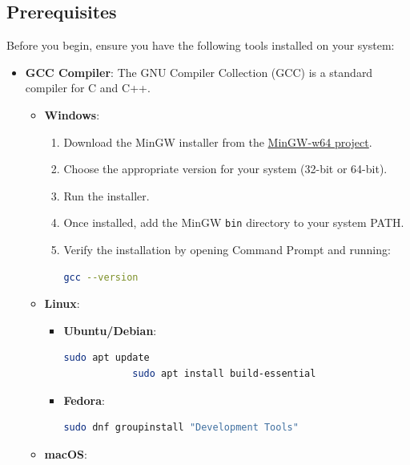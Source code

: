 \documentclass[12pt,a4paper]{report}
\begin{document}
\subsection{Prerequisites}
Before you begin, ensure you have the following tools installed on your system:
\begin{itemize}
    \item \normalsize \textbf{GCC Compiler}: The GNU Compiler Collection (GCC) is a standard compiler for C and C++.
    \begin{itemize}
        \item \normalsize \textbf{Windows}:
        \begin{enumerate}
            \item Download the MinGW installer from the \href{https://sourceforge.net/projects/mingw/files/latest/download}{MinGW-w64 project}.
            \item Choose the appropriate version for your system (32-bit or 64-bit).
            \item Run the installer.
            \item Once installed, add the MinGW \texttt{bin} directory to your system PATH.\
            \item Verify the installation by opening Command Prompt and running:
            \begin{lstlisting}[language=Bash, caption=GCC Version Check]
            gcc --version
            \end{lstlisting}
        \end{enumerate}
        \item \normalsize \textbf{Linux}:
        \begin{itemize}
            \item \normalsize \textbf{Ubuntu/Debian}:
            \begin{lstlisting}[language=Bash, caption=GCC Installation Ubuntu/Debian]
            sudo apt update
            sudo apt install build-essential
            \end{lstlisting}
            \item \normalsize \textbf{Fedora}:
            \begin{lstlisting}[language=Bash, caption=GCC Installation Fedora]
            sudo dnf groupinstall "Development Tools"
            \end{lstlisting}
        \end{itemize}
        \item \normalsize \textbf{macOS}:
        \begin{lstlisting}[language=Bash, caption=GCC Installation macOS]

\end{lstlisting}
\end{itemize}
\end{itemize}
\end{document}
